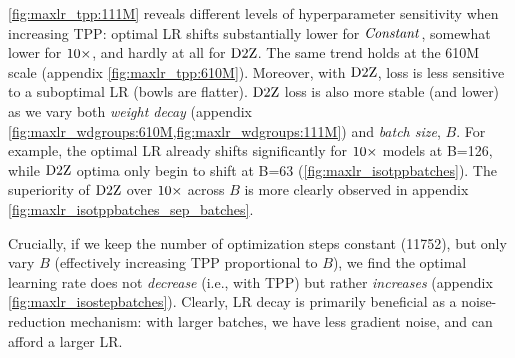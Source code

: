 \begin{figure}
\noindent %
\begin{minipage}[b]{0.39\textwidth}
  \centering
  
\end{minipage}%
\hfill %
\begin{minipage}[b]{0.57\textwidth}
  \centering
  
\end{minipage}
\end{figure}


\cref{fig:maxlr_tpp:111M} reveals different levels of hyperparameter
sensitivity when increasing TPP\@: optimal LR shifts substantially
lower for $\mbox{\emph{Constant}}$, somewhat lower for $\mbox{10}\times$, and hardly at all
for $\mbox{D2Z}$.  The same trend holds at the 610M scale (appendix
\cref{fig:maxlr_tpp:610M}).
%
Moreover, with $\mbox{D2Z}$, loss is less sensitive to a suboptimal LR
(bowls are flatter).
%
$\mbox{D2Z}$ loss is also more stable (and lower) as we vary both
\emph{weight decay} (appendix
\cref{fig:maxlr_wdgroups:610M,fig:maxlr_wdgroups:111M}) and
\emph{batch size}, $B$.
%
For example, the optimal LR already shifts significantly for $\mbox{10}\times$
models at B=126, while $\mbox{D2Z}$ optima only begin to shift at B=63
(\cref{fig:maxlr_isotppbatches}).  The superiority of $\mbox{D2Z}$ over
$\mbox{10}\times$ across $B$ is more clearly observed in appendix
\cref{fig:maxlr_isotppbatches_sep_batches}.

Crucially, if we keep the number of optimization steps constant
(11752), but only vary $B$ (effectively increasing TPP proportional to
$B$), we find the optimal learning rate does not \emph{decrease}
(i.e., with TPP) but rather \emph{increases} (appendix
\cref{fig:maxlr_isostepbatches}).  Clearly, LR decay is primarily
beneficial as a noise-reduction mechanism: with larger batches, we
have less gradient noise, and can afford a larger LR\@.


\begin{figure}
  \noindent
\begin{minipage}[b]{0.40\textwidth}
  \centering
  
\end{minipage}%
\hfill
\begin{minipage}[b]{0.58\textwidth}
  \centering
  
\end{minipage}
\end{figure}

